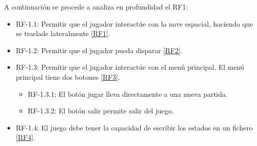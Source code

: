 A continuación se procede a analiza en profundidad el RF1:
\begin{itemize}
    \item RF-1.1: Permitir que el jugador interactúe con la nave espacial, haciendo que se traslade lateralmente \ref{RF1}.
    \item RF-1.2: Permitir que el jugador pueda disparar \ref{RF2}.
    \item RF-1.3: Permitir que el jugador interactúe con el menú principal. El menú principal tiene dos botones \ref{RF3}.
        \begin{itemize}
            \item RF-1.3.1: El botón jugar lleva directamente a una nueva partida.
            \item RF-1.3.2: El botón salir permite salir del juego.
        \end{itemize}
    \item RF-1.4: El juego debe tener la capacidad de escribir los estados en un fichero \ref{RF4}.
\end{itemize}



